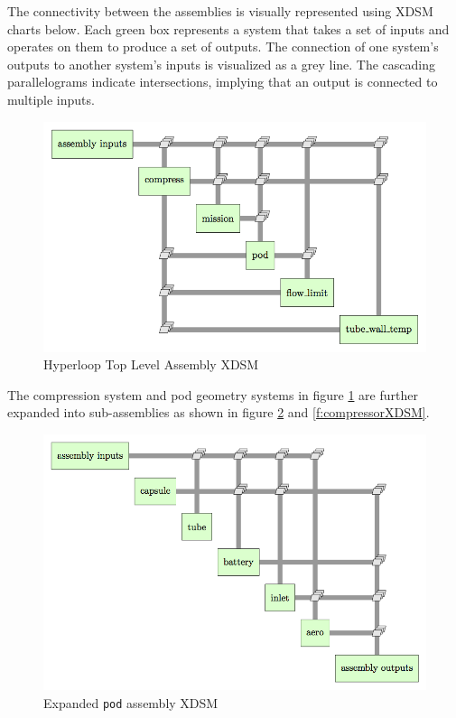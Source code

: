 \documentclass[heading.tex]{subfiles}
\begin{document}
The connectivity between the assemblies is visually represented using XDSM charts below. Each green box represents a system that takes a
set of inputs and operates on them to produce a set of outputs. The connection of one system's outputs to another system's inputs is
visualized as a grey line. The cascading parallelograms indicate intersections, implying that an output is connected to multiple inputs. 


\begin{figure}[hbtp]
\centering
\includegraphics[scale=1]{images/hyperloop_assembly_xdsm.png}
\caption{Hyperloop Top Level Assembly XDSM}
\label{f:hyperloopXDSM}
\end{figure}

The compression system and pod geometry systems in figure \ref{f:hyperloopXDSM} are further expanded into sub-assemblies as shown in figure \ref{f:podXDSM} and \ref{f:compressorXDSM}.

\begin{figure}[hbtp]
\centering
\includegraphics[scale=1]{images/pod_assembly_xdsm.png}
\caption{Expanded \texttt{pod} assembly XDSM}
\label{f:podXDSM}
\end{figure}
\end{document}
